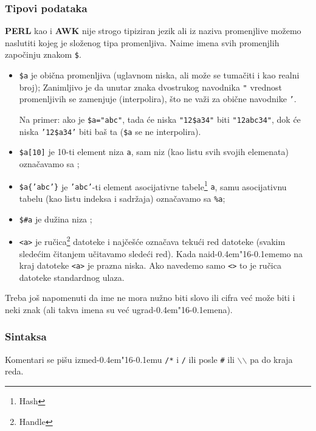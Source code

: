 \documentclass[12pt,a4paper]{article}
\def\d{d\kern-0.4em\char"16\kern-0.1em}
\def\bs{$\backslash$}
\begin{document}
      \subsubsection{Tipovi podataka}
        {\bf PERL} kao i {\bf AWK} nije strogo tipiziran jezik ali iz naziva
        promenjlive mo\v ze\-mo naslutiti kojeg je slo\v zenog tipa
        promenljiva.
        Naime imena svih promenjlih zapo\v cinju znakom {\tt\$}.
        \begin{itemize}
        \item
          {\tt\$a} je obi\v cna promenljiva (uglavnom niska, ali mo\v ze se
          tuma\v citi i kao realni broj);
          Zanimljivo je da unutar znaka dvostrukog navodnika {\tt"} vrednost
          promenljivih se zamenjuje (interpolira), \v sto ne va\v zi za
          obi\v cne navodnike {\tt'}.

          Na primer: ako je {\tt\$a="abc"}, tada \'ce niska {\tt"12\$a34"}
          biti {\tt"12abc34"}, dok \'ce niska {\tt'12\$a34'} biti ba\v s
          ta ({\tt\$a} se ne interpolira).
        \item
          {\tt\$a[10]} je 10-ti element niza {\tt a}, sam niz (kao listu svih
          svojih elemenata) ozna\v cavamo sa {\tt@a};
        \item
          {\tt\$a\{'abc'\}} je {\tt'abc'}-ti element asocijativne
          tabele\footnote{Hash} {\tt a}, samu asocijativnu tabelu (kao listu
          indeksa i sadr\v zaja) ozna\v cavamo sa {\tt\%a};
        \item
          {\tt\$\#a} je du\v zina niza {\tt@a};
        \item
          {\tt<a>} je ru\v cica\footnote{Handle} datoteke i naj\v ce\v s\'ce
          ozna\v cava teku\'ci red datoteke (svakim slede\'cim \v citanjem
          u\v citavamo slede\'ci red).
          Kada nai\d emo na kraj dato\-teke {\tt<a>} je prazna niska.
          Ako navedemo samo {\tt<>} to je ru\v cica datoteke standardnog
          ulaza.
        \end{itemize}

        Treba jo\v s napomenuti da ime ne mora nu\v zno biti slovo ili cifra
        ve\'c mo\v ze biti i neki znak (ali takva imena su ve\'c ugra\d ena).
%
      \subsubsection{Sintaksa}
        Komentari se pi\v su izme\d u {\tt/*} i {\tt*/} ili posle {\tt\#} ili
        {\tt\bs\bs} pa do kraja reda.
\end{document}
